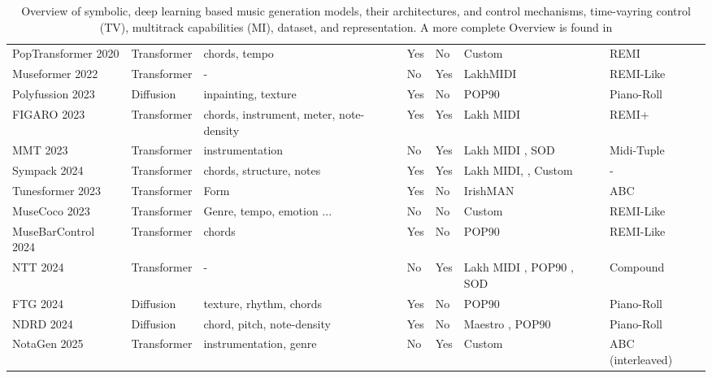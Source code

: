 \begin{table}[H]
\begin{tabular}{|p{2.5cm}|p{1.8cm}|p{3cm}|p{1cm}|p{1cm}|p{3cm}|p{2.5cm}|}
        PopTransformer 2020 \cite{Huang_Yang_remi_pop_transformer_2020} & Transformer & chords, tempo & Yes & No & Custom & REMI\\
        Museformer 2022 \cite{Yu_Lu_Wang_Hu_Tan_Ye_Zhang_museformer_2022} & Transformer & - & No & Yes & LakhMIDI \cite{Raffel_2016} & REMI-Like\\
        Polyfussion 2023 \cite{Min_Jiang_Xia_Zhao_polyffusion_2023} & Diffusion & inpainting, texture & Yes & No & POP90 \cite{Wang_Chen_pop90_dataset} & Piano-Roll\\
        FIGARO 2023 \cite{Rütte_figaro_2023} & Transformer & chords, instrument, meter, note-density & Yes & Yes & Lakh MIDI \cite{Raffel_2016} & REMI+ \\
        MMT 2023 \cite{Dong_Chen_MMT_Kirkpatrick_2023} & Transformer & instrumentation & No & Yes & Lakh MIDI \cite{Raffel_2016}, SOD \cite{Crestel_OrchestralDataset} & Midi-Tuple \\
        Sympack 2024 \cite{Chen_Smith_Spijkervet_Wang_Zou_Li_Kong_Du_2024} & Transformer & chords, structure, notes & Yes & Yes & Lakh MIDI\cite{Raffel_2016}, \cite{Bertin-Mahieux_Ellis_Whitman_Lamere_2011}, Custom & -\\
        Tunesformer 2023 \cite{tunesformer} & Transformer & Form & Yes & No & IrishMAN\cite{tunesformer} & ABC \\
        MuseCoco 2023 \cite{Lu_Xu_Kang_Yu_Xing_Tan_Bian_MuseCoco_2023} & Transformer & Genre, tempo, emotion ...  & No & No & Custom & REMI-Like\\
        MuseBarControl 2024 \cite{Shu_Xu_Musebarcontrol_2024} & Transformer & chords & Yes & No & POP90 \cite{Wang_Chen_pop90_dataset} & REMI-Like\\
        NTT 2024 \cite{Ryu_Dong_nested_2024} & Transformer & - & No  & Yes & Lakh MIDI \cite{Raffel_2016}, POP90 \cite{Wang_Chen_pop90_dataset}, SOD \cite{Crestel_OrchestralDataset} & Compound\\
        FTG 2024 \cite{Zhu_Liu_Jiang_Zheng_texture_2024} & Diffusion & texture, rhythm, chords & Yes & No & POP90 \cite{Wang_Chen_pop90_dataset} & Piano-Roll \\
        NDRD 2024 \cite{Huang_rule_diffusion_2024} & Diffusion & chord, pitch, note-density & Yes & No & Maestro \cite{hawthorne2018maestro}, POP90 \cite{Wang_Chen_pop90_dataset} & Piano-Roll \\
        NotaGen 2025 \cite{wang2025notagenadvancingmusicalitysymbolic} & Transformer & instrumentation, genre & No & Yes & Custom & ABC (interleaved)\\
        \hline
    \end{tabular}
    \caption{Overview of symbolic, deep learning based music generation models, their architectures, and control mechanisms, time-vayring control (TV), multitrack capabilities (MI), dataset, and representation. A more complete Overview
    is found in \cite{Ji_Yang_Luo_survey_symbolic_2024}}
    \label{table:bigtable}
\end{table}

